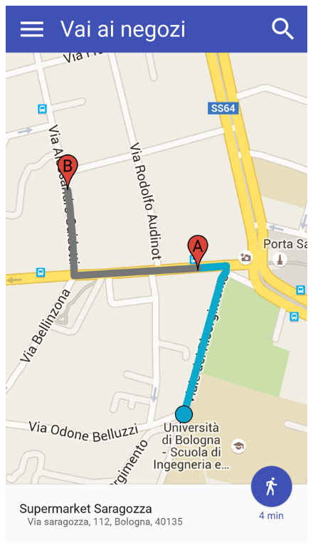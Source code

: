 \begin{figure}[H]
\begin{minipage}{.49\textwidth}
		\includegraphics[width=\textwidth]{img/wireframe/mappa.png}
	\end{minipage}
\end{figure}
